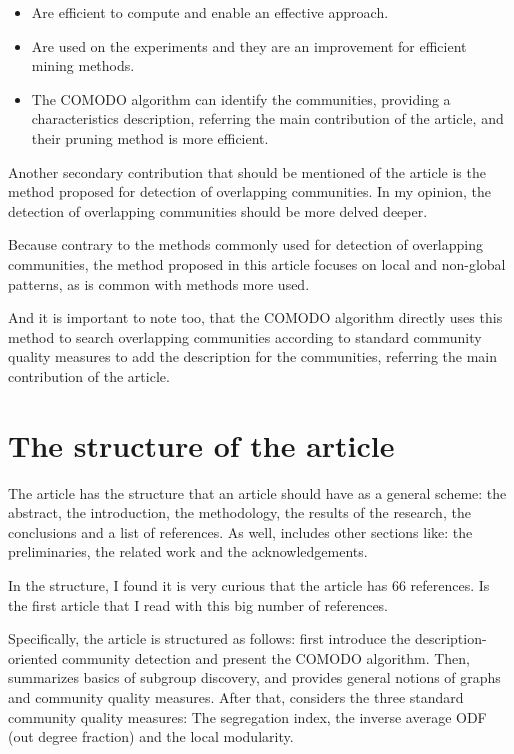 \documentclass[a4paper]{article}
\begin{document}
\begin{itemize}
	\item Are efficient to compute and enable an effective approach.
	\item Are used on the experiments and they are an improvement for efficient mining methods.
	\item The COMODO algorithm can identify the communities, providing a characteristics description, referring the main contribution of the article, and their pruning method is more efficient.
\end{itemize}

Another secondary contribution that should be mentioned of the article is the method proposed for detection of overlapping communities. In my opinion, the detection of overlapping communities should be more delved deeper.

Because contrary to the methods commonly used for detection of overlapping communities, the method proposed in this article focuses on local and non-global patterns, as is common with methods more used.

And it is important to note too, that the COMODO algorithm directly uses this method to search overlapping communities according to standard community quality measures to add the description for the communities, referring the main contribution of the article.

\section*{The structure of the article}
The article has the structure that an article should have as a general scheme: the abstract, the introduction, the methodology, the results of the research, the conclusions and a list of references. As well, includes other sections like: the preliminaries, the related work and the acknowledgements.

In the structure, I found it is very curious that the article has 66 references. Is the first article that I read with this big number of references.

Specifically, the article is structured as follows: first introduce the description-oriented community detection and present the COMODO algorithm. Then, summarizes basics of subgroup discovery, and provides general notions of graphs and community quality measures. After that, considers the three standard community quality measures: The segregation index, the inverse average ODF (out degree fraction) and the local modularity.
\end{document}
